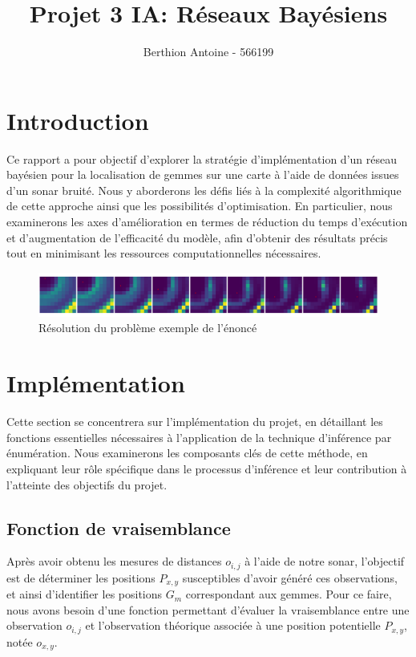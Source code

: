 \documentclass{article}
\title{Projet 3 IA: Réseaux Bayésiens}
\author{Berthion Antoine - 566199}
\begin{document}
\maketitle

\section{Introduction}

\noindent Ce rapport a pour objectif d'explorer la stratégie d'implémentation d’un réseau bayésien pour la localisation de gemmes sur une carte à l’aide de données issues d’un sonar bruité. Nous y aborderons les défis liés à la complexité algorithmique de cette approche ainsi que les possibilités d’optimisation. En particulier, nous examinerons les axes d’amélioration en termes de réduction du temps d'exécution et d’augmentation de l'efficacité du modèle, afin d’obtenir des résultats précis tout en minimisant les ressources computationnelles nécessaires.

\begin{figure}[h]
    \centering
    \includegraphics[width=1\textwidth]{src/intro.png}
    \caption{Résolution du problème exemple de l'énoncé}
    \label{fig:intro}
\end{figure}

\section{Implémentation}

\noindent Cette section se concentrera sur l’implémentation du projet, en détaillant les fonctions essentielles nécessaires à l’application de la technique d'inférence par énumération. Nous examinerons les composants clés de cette méthode, en expliquant leur rôle spécifique dans le processus d'inférence et leur contribution à l'atteinte des objectifs du projet.

\subsection{Fonction de vraisemblance} \label{sec:vraisemblance}

\noindent Après avoir obtenu les mesures de distances \( o_{i,j} \) à l'aide de notre sonar, l'objectif est de déterminer les positions \( P_{x,y} \) susceptibles d'avoir généré ces observations, et ainsi d'identifier les positions \( G_m \) correspondant aux gemmes. Pour ce faire, nous avons besoin d'une fonction permettant d'évaluer la vraisemblance entre une observation \( o_{i,j} \) et l'observation théorique associée à une position potentielle \( P_{x,y} \), notée \( o_{x,y} \). 
\end{document}
